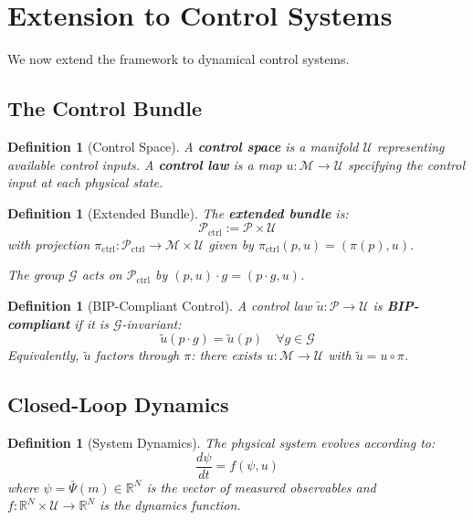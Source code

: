 \documentclass[11pt]{article}
\newtheorem{definition}[theorem]{Definition}
\begin{document}
\section{Extension to Control Systems}

We now extend the framework to dynamical control systems.

\subsection{The Control Bundle}

\begin{definition}[Control Space]
A \textbf{control space} is a manifold $\mathcal{U}$ representing available control
inputs. A \textbf{control law} is a map $u : \mathcal{M} \to \mathcal{U}$ specifying the control input at each physical state.
\end{definition}

\begin{definition}[Extended Bundle]
The \textbf{extended bundle} is:
\[
\mathcal{P}_{\mathrm{ctrl}} := \mathcal{P} \times \mathcal{U}
\]
with projection $\pi_{\mathrm{ctrl}} : \mathcal{P}_{\mathrm{ctrl}} \to \mathcal{M} \times \mathcal{U}$ given by $\pi_{\mathrm{ctrl}}(p, u) = (\pi(p), u)$.

The group $\mathcal{G}$ acts on $\mathcal{P}_{\mathrm{ctrl}}$ by $(p, u) \cdot g = (p \cdot g, u)$.
\end{definition}

\begin{definition}[BIP-Compliant Control]
A control law $\tilde{u} : \mathcal{P} \to \mathcal{U}$ is \textbf{BIP-compliant} if it is
$\mathcal{G}$-invariant:
\[
\tilde{u}(p \cdot g) = \tilde{u}(p) \quad \forall g \in \mathcal{G}
\]
Equivalently, $\tilde{u}$ factors through $\pi$: there exists $u : \mathcal{M} \to \mathcal{U}$ with $\tilde{u} = u \circ \pi$.
\end{definition}

\subsection{Closed-Loop Dynamics}

\begin{definition}[System Dynamics]
The physical system evolves according to:
\begin{equation}
\frac{d\psi}{dt} = f(\psi, u)
\label{eq:dynamics}
\end{equation}
where $\psi = \bar{\Psi}(m) \in \mathbb{R}^N$ is the vector of measured observables and $f : \mathbb{R}^N \times \mathcal{U} \to \mathbb{R}^N$ is the
dynamics function.
\end{definition}
\end{document}
